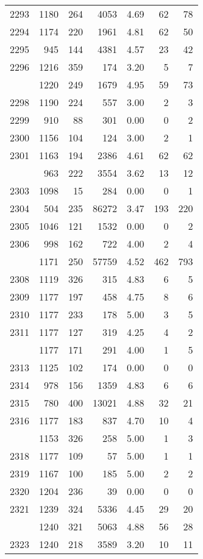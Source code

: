 \documentclass[
]{article}
\begin{document}
\begin{table}
\begin{tabular}[t]{lrrrrrr}
2293 & 1180 & 264 & 4053 & 4.69 & 62 & 78\\
2294 & 1174 & 220 & 1961 & 4.81 & 62 & 50\\
2295 & 945 & 144 & 4381 & 4.57 & 23 & 42\\
2296 & 1216 & 359 & 174 & 3.20 & 5 & 7\\
\addlinespace
2297 & 1220 & 249 & 1679 & 4.95 & 59 & 73\\
2298 & 1190 & 224 & 557 & 3.00 & 2 & 3\\
2299 & 910 & 88 & 301 & 0.00 & 0 & 2\\
2300 & 1156 & 104 & 124 & 3.00 & 2 & 1\\
2301 & 1163 & 194 & 2386 & 4.61 & 62 & 62\\
\addlinespace
2302 & 963 & 222 & 3554 & 3.62 & 13 & 12\\
2303 & 1098 & 15 & 284 & 0.00 & 0 & 1\\
2304 & 504 & 235 & 86272 & 3.47 & 193 & 220\\
2305 & 1046 & 121 & 1532 & 0.00 & 0 & 2\\
2306 & 998 & 162 & 722 & 4.00 & 2 & 4\\
\addlinespace
2307 & 1171 & 250 & 57759 & 4.52 & 462 & 793\\
2308 & 1119 & 326 & 315 & 4.83 & 6 & 5\\
2309 & 1177 & 197 & 458 & 4.75 & 8 & 6\\
2310 & 1177 & 233 & 178 & 5.00 & 3 & 5\\
2311 & 1177 & 127 & 319 & 4.25 & 4 & 2\\
\addlinespace
2312 & 1177 & 171 & 291 & 4.00 & 1 & 5\\
2313 & 1125 & 102 & 174 & 0.00 & 0 & 0\\
2314 & 978 & 156 & 1359 & 4.83 & 6 & 6\\
2315 & 780 & 400 & 13021 & 4.88 & 32 & 21\\
2316 & 1177 & 183 & 837 & 4.70 & 10 & 4\\
\addlinespace
2317 & 1153 & 326 & 258 & 5.00 & 1 & 3\\
2318 & 1177 & 109 & 57 & 5.00 & 1 & 1\\
2319 & 1167 & 100 & 185 & 5.00 & 2 & 2\\
2320 & 1204 & 236 & 39 & 0.00 & 0 & 0\\
2321 & 1239 & 324 & 5336 & 4.45 & 29 & 20\\
\addlinespace
2322 & 1240 & 321 & 5063 & 4.88 & 56 & 28\\
2323 & 1240 & 218 & 3589 & 3.20 & 10 & 11\\

\end{tabular}
\end{table}
\end{document}
